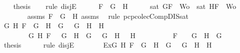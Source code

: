 \begin{isabellebody}
\ \ \isamarkupfalse%
\ {\isacharquery}thesis\isanewline
\ \ \isamarkupfalse%
\ {\isacharparenleft}rule\ disjE{\isacharparenright}\isanewline
\ \ \ \ \isamarkupfalse%
\ {\isachardoublequoteopen}F\ {\isacharequal}\ G\ \isactrlbold {\isasymor}\ H{\isachardoublequoteclose}\isanewline
\ \ \ \ \isamarkupfalse%
\ {\isachardoublequoteopen}sat\ {\isacharparenleft}{\isacharbraceleft}G{\isacharcomma}F{\isacharbraceright}\ {\isasymunion}\ Wo{\isacharparenright}\ {\isasymor}\ sat\ {\isacharparenleft}{\isacharbraceleft}H{\isacharcomma}F{\isacharbraceright}\ {\isasymunion}\ Wo{\isacharparenright}{\isachardoublequoteclose}\isanewline
\ \ \ \ \ \ \isamarkupfalse%
\ assms{\isacharparenleft}{}{\isacharparenright}\ {\isacartoucheopen}F\ {\isacharequal}\ G\ \isactrlbold {\isasymor}\ H{\isacartoucheclose}\ assms{\isacharparenleft}{}{\isacharcomma}{}{\isacharcomma}{}{\isacharparenright}\ \isamarkupfalse%
\ {\isacharparenleft}rule\ pcp{\isacharunderscore}colecComp{\isacharunderscore}DIS{\isacharunderscore}sat{}{\isacharparenright}\isanewline
\ \ \isamarkupfalse%
\isanewline
\ \ \ \ \isamarkupfalse%
\ {\isachardoublequoteopen}{\isacharparenleft}{\isasymexists}G{}\ H{}{\isachardot}\ F\ {\isacharequal}\ G{}\ \isactrlbold {\isasymrightarrow}\ H{}\ {\isasymand}\ G\ {\isacharequal}\ \isactrlbold {\isasymnot}\ G{}\ {\isasymand}\ H\ {\isacharequal}\ H{}{\isacharparenright}\ {\isasymor}\ \isanewline
\ \ \ \ \ \ \ \ {\isacharparenleft}{\isasymexists}G{}\ H{}{\isachardot}\ F\ {\isacharequal}\ \isactrlbold {\isasymnot}\ {\isacharparenleft}G{}\ \isactrlbold {\isasymand}\ H{}{\isacharparenright}\ {\isasymand}\ G\ {\isacharequal}\ \isactrlbold {\isasymnot}\ G{}\ {\isasymand}\ H\ {\isacharequal}\ \isactrlbold {\isasymnot}\ H{}{\isacharparenright}\ {\isasymor}\ \isanewline
\ \ \ \ \ \ \ \ F\ {\isacharequal}\ \isactrlbold {\isasymnot}\ {\isacharparenleft}\isactrlbold {\isasymnot}\ G{\isacharparenright}\ {\isasymand}\ H\ {\isacharequal}\ G{\isachardoublequoteclose}\isanewline
\ \ \ \ \isamarkupfalse%
\ {\isacharquery}thesis\isanewline
\ \ \ \ \isamarkupfalse%
\ {\isacharparenleft}rule\ disjE{\isacharparenright}\isanewline
\ \ \ \ \ \ \isamarkupfalse%
\ Ex{}{\isacharcolon}{\isachardoublequoteopen}{\isasymexists}G{}\ H{}{\isachardot}\ F\ {\isacharequal}\ G{}\ \isactrlbold {\isasymrightarrow}\ H{}\ {\isasymand}\ G\ {\isacharequal}\ \isactrlbold {\isasymnot}\ G{}\ {\isasymand}\ H\ {\isacharequal}\ H{}{\isachardoublequoteclose}\isanewline

\end{isabellebody}
